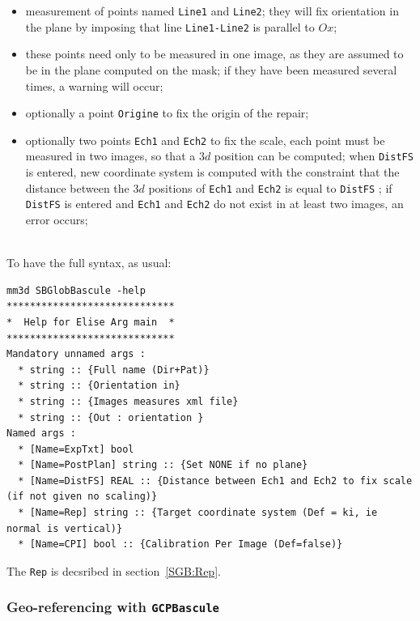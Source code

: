 \begin{itemize}
   \item measurement of points named {\tt Line1} and  {\tt Line2};
	 they will fix orientation in the plane by imposing that line
	   {\tt Line1-Line2} is parallel to $Ox$;

   \item these points need only to be measured in one image, as they are
	 assumed  to be in the plane  computed on the mask; if they have been
	 measured several times, a warning will occur;

   \item optionally a point {\tt Origine} to fix the origin of the repair;

   \item optionally two points {\tt Ech1} and {\tt Ech2} to fix the scale,
	 each point must be measured in two images, so that a $3d$ position
	 can be computed; when {\tt DistFS} is entered, new coordinate system
	 is computed with the constraint that the distance between the $3d$
	 positions of {\tt Ech1} and {\tt Ech2} is equal to {\tt DistFS} ;
	 if {\tt DistFS} is entered and {\tt Ech1} and {\tt Ech2} do not
	 exist in at least two images, an error occurs;
\end{itemize}
~\\
To have the full syntax, as usual:

\begin{verbatim}
mm3d SBGlobBascule -help
*****************************
*  Help for Elise Arg main  *
*****************************
Mandatory unnamed args : 
  * string :: {Full name (Dir+Pat)}
  * string :: {Orientation in}
  * string :: {Images measures xml file}
  * string :: {Out : orientation }
Named args : 
  * [Name=ExpTxt] bool
  * [Name=PostPlan] string :: {Set NONE if no plane}
  * [Name=DistFS] REAL :: {Distance between Ech1 and Ech2 to fix scale (if not given no scaling)}
  * [Name=Rep] string :: {Target coordinate system (Def = ki, ie normal is vertical)}
  * [Name=CPI] bool :: {Calibration Per Image (Def=false)}
\end{verbatim}

The {\tt Rep} is decsribed in section~\ref{SGB:Rep}.


\subsubsection{Geo-referencing with {\tt GCPBascule}}

\label{Sec:GCPBascule}

